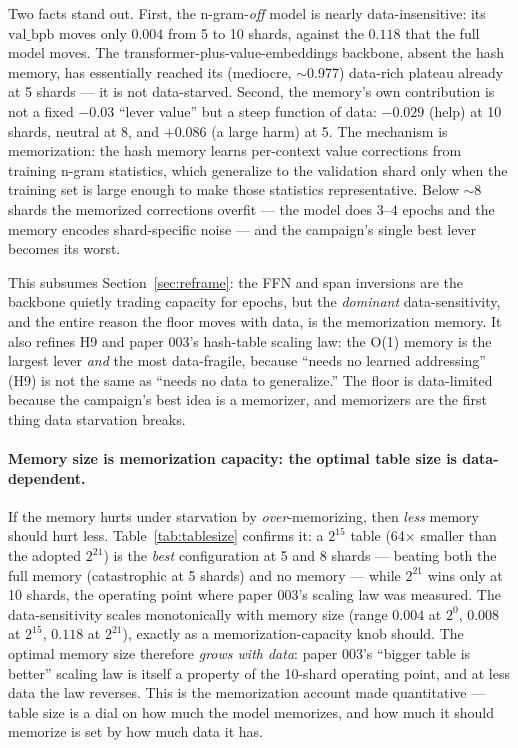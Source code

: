 \documentclass{article}
\newcommand{\valbpb}{\mathrm{val\_bpb}}
\begin{document}
Two facts stand out. First, the n-gram-\emph{off} model is nearly data-insensitive: its $\valbpb$ moves only $0.004$ from 5 to 10 shards, against the $0.118$ that the full model moves. The transformer-plus-value-embeddings backbone, absent the hash memory, has essentially reached its (mediocre, $\sim$0.977) data-rich plateau already at 5 shards --- it is not data-starved. Second, the memory's own contribution is not a fixed $-0.03$ ``lever value'' but a steep function of data: $-0.029$ (help) at 10 shards, neutral at 8, and $+0.086$ (a large harm) at 5. The mechanism is memorization: the hash memory learns per-context value corrections from training n-gram statistics, which generalize to the validation shard only when the training set is large enough to make those statistics representative. Below $\sim$8 shards the memorized corrections overfit --- the model does $3$--$4$ epochs and the memory encodes shard-specific noise --- and the campaign's single best lever becomes its worst.

This subsumes Section~\ref{sec:reframe}: the FFN and span inversions are the backbone quietly trading capacity for epochs, but the \emph{dominant} data-sensitivity, and the entire reason the floor moves with data, is the memorization memory. It also refines H9 and paper 003's hash-table scaling law: the O(1) memory is the largest lever \emph{and} the most data-fragile, because ``needs no learned addressing'' (H9) is not the same as ``needs no data to generalize.'' The floor is data-limited because the campaign's best idea is a memorizer, and memorizers are the first thing data starvation breaks.

\paragraph{Memory size is memorization capacity: the optimal table size is data-dependent.} If the memory hurts under starvation by \emph{over}-memorizing, then \emph{less} memory should hurt less. Table~\ref{tab:tablesize} confirms it: a $2^{15}$ table (64$\times$ smaller than the adopted $2^{21}$) is the \emph{best} configuration at 5 and 8 shards --- beating both the full memory (catastrophic at 5 shards) and no memory --- while $2^{21}$ wins only at 10 shards, the operating point where paper 003's scaling law was measured. The data-sensitivity scales monotonically with memory size (range $0.004$ at $2^{0}$, $0.008$ at $2^{15}$, $0.118$ at $2^{21}$), exactly as a memorization-capacity knob should. The optimal memory size therefore \emph{grows with data}: paper 003's ``bigger table is better'' scaling law is itself a property of the 10-shard operating point, and at less data the law reverses. This is the memorization account made quantitative --- table size is a dial on how much the model memorizes, and how much it should memorize is set by how much data it has.
\end{document}

